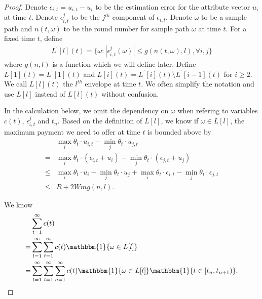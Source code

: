 \documentclass{article}
\begin{document}
\begin{proof}
Denote $\epsilon_{i,t}=u_{i,t}-u_{i}$ to be the estimation error for the attribute vector $u_i$ at time $t$. Denote $\epsilon_{i,t}^{j}$ to be the $j^{th}$ component of $\epsilon_{i,t}$. Denote $\omega$ to be a sample path and $n(t,\omega)$ to be the round number for sample path $\omega$ at time $t$. For a fixed time $t$, define
\begin{align}
L^{'}[l](t) = \{\omega:|\epsilon_{i,t}^{j}(\omega)|\leq g(n(t,\omega),l), \forall i,j\}\nonumber
\end{align}
where $g(n,l)$ is a function which we will define later. Define $L[1](t) = L^{'}[1](t)$ and $L[i](t) = L^{'}[i](t)\setminus L^{'}[i-1](t)$ for $i\geq 2$. We call $L[l](t)$ the $l^{th}$ envelope at time $t$. We often simplify the notation and use $L[l]$ instead of $L[l](t)$ without confusion.

In the calculation below, we omit the dependency on $\omega$ when refering to variables $c(t)$, $\epsilon_{i,t}^{j}$ and $t_n$. Based on the definition of $L[l]$, we know if $\omega\in L[l]$, the maximum payment we need to offer at time $t$ is bounded above by 
\begin{align}
&\max_{i}\theta_t\cdot u_{i,t} - \min_{j}\theta_t\cdot u_{j,t} \nonumber \\
= &\max_{i}\theta_t\cdot (\epsilon_{i,t}+u_i) - \min_{j}\theta_t\cdot (\epsilon_{j,t}+u_j) \nonumber \\
\leq &\max_{i}\theta_t\cdot u_i - \min_{j}\theta_t\cdot u_j +\max_{i}\theta_t\cdot \epsilon_{i,t} - \min_{j}\theta_t\cdot \epsilon_{j,t}\nonumber \\
\leq & R + 2Wmg(n,l). \nonumber
\end{align}

We know
\begin{align}
&\sum_{t=1}^{\infty}c(t) \nonumber \\
=&\sum_{l=1}^{\infty}\sum_{t=1}^{\infty}c(t)\mathbbm{1}\{\omega\in L[l]\} \nonumber \\
=&\sum_{l=1}^{\infty}\sum_{t=1}^{\infty}\sum_{n=1}^{\infty}c(t)\mathbbm{1}\{\omega\in L[l]\}\mathbbm{1}\{t\in [t_n,t_{n+1})\}. \nonumber
\end{align}


\end{proof}
\end{document}
